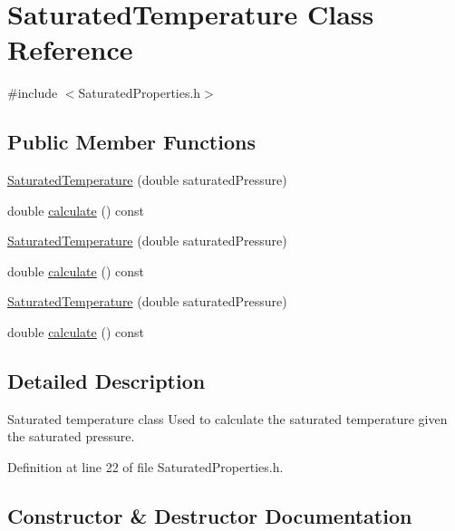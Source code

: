\hypertarget{class_saturated_temperature}{}\section{Saturated\+Temperature Class Reference}
\label{class_saturated_temperature}


{\ttfamily \#include $<$Saturated\+Properties.\+h$>$}

\subsection*{Public Member Functions}
\begin{DoxyCompactItemize}
\item 
\hyperlink{class_saturated_temperature_ae0a4b1684a756ac8f91d3ebb646d6865}{Saturated\+Temperature} (double saturated\+Pressure)
\item 
double \hyperlink{class_saturated_temperature_a4aa0d2a337289dd36f4e063f1f67aaa5}{calculate} () const
\item 
\hyperlink{class_saturated_temperature_ae0a4b1684a756ac8f91d3ebb646d6865}{Saturated\+Temperature} (double saturated\+Pressure)
\item 
double \hyperlink{class_saturated_temperature_a4aa0d2a337289dd36f4e063f1f67aaa5}{calculate} () const
\item 
\hyperlink{class_saturated_temperature_ae0a4b1684a756ac8f91d3ebb646d6865}{Saturated\+Temperature} (double saturated\+Pressure)
\item 
double \hyperlink{class_saturated_temperature_a4aa0d2a337289dd36f4e063f1f67aaa5}{calculate} () const
\end{DoxyCompactItemize}


\subsection{Detailed Description}
Saturated temperature class Used to calculate the saturated temperature given the saturated pressure. 

Definition at line 22 of file Saturated\+Properties.\+h.



\subsection{Constructor \& Destructor Documentation}
\mbox{\label{class_saturated_temperature_ae0a4b1684a756ac8f91d3ebb646d6865}} 
